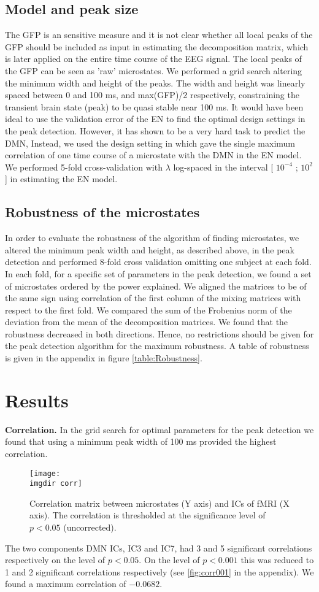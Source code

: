 \documentclass{article}
\newcommand{\imgdir}{Images/} %
\begin{document}
\subsection{Model and peak size}
The GFP is an sensitive measure and it is not clear whether all local peaks of the GFP should be included as input in estimating the decomposition matrix, which is later applied on the entire time course of the EEG signal. The local peaks of the GFP can be seen as 'raw' microstates. We performed a grid search altering the minimum width and height of the peaks. The width and height was linearly spaced between 0 and 100 ms, and max(GFP)/2 respectively, constraining the transient brain state (peak) to be quasi stable near 100 ms.
It would have been ideal to use the validation error of the EN to find the optimal design settings in the peak detection. However, it has shown to be a very hard task to predict the DMN, Instead, we used the design setting in which gave the single maximum correlation of one time course of a microstate with the DMN in the EN model.
We performed 5-fold cross-validation with $\lambda$ log-spaced in the interval 
[ $10^{-4}$ ; $10^2$] in estimating the EN model.
\subsection{Robustness of the microstates}
In order to evaluate the robustness of the algorithm of finding microstates, we altered the minimum peak width and height, as described above, in the peak detection and performed 8-fold cross validation omitting one subject at each fold. In each fold, for a specific set of parameters in the peak detection, we found a set of microstates ordered by the power explained. We aligned the matrices to be of the same sign using correlation of the first column of the mixing matrices with respect to the first fold. We compared the sum of the Frobenius norm of the deviation from the mean of the decomposition matrices. We found that the robustness decreased in both directions. Hence, no restrictions should be given for the peak detection algorithm for the maximum robustness. A table of robustness is given in the appendix in figure \ref{table:Robustness}.


\section{Results}

\textbf{Correlation.} In the grid search for optimal parameters for the peak detection we found that using a minimum peak width of 100 ms provided the highest correlation.
\begin{figure}[!ht]
    \centering
    \texttt{[image: \\imgdir corr]}
    \caption{Correlation matrix between microstates (Y axis) and ICs of fMRI (X axis). The correlation is thresholded at the significance level of $p<0.05$ (uncorrected).}
    \label{fig:grid}
\end{figure}
The two components DMN ICs, IC3 and IC7, had 3 and 5 significant correlations respectively on the level of $p<0.05$. On the level of $p<0.001$ this was reduced to 1 and 2 significant correlations respectively (see \ref{fig:corr001} in the appendix). We found a maximum correlation of $-0.0682$.
\end{document}
